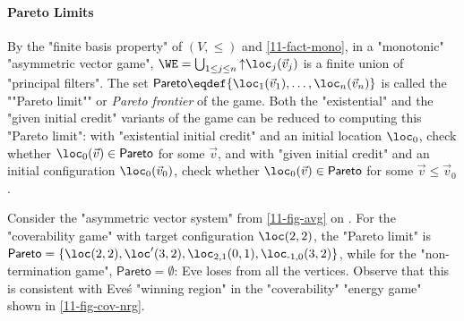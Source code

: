 \paragraph{Pareto Limits}\AP By the "finite basis property" of
$(V,{\leq})$ and \cref{11-fact-mono}, in a "monotonic" "asymmetric
vector game", $\WE=\bigcup_{1\leq j\leq n}{\uparrow}\loc_j(\vec v_j)$
is a finite union of "principal filters".  The set
$\mathsf{Pareto}\eqdef\{\loc_1(\vec v_1),\dots,\loc_n(\vec v_n)\}$ is
called the ""Pareto limit"" or \emph{Pareto frontier} of the game.
Both the "existential" and the "given initial credit" variants of the
game can be reduced to computing this "Pareto limit": with
"existential initial credit" and an initial location $\loc_0$, check
whether $\loc_0(\vec v)\in\mathsf{Pareto}$ for some $\vec v$, and with
"given initial credit" and an initial configuration $\loc_0(\vec v_0)$, check
whether $\loc_0(\vec v)\in\mathsf{Pareto}$ for some $\vec v\leq\vec
v_0$.
\begin{example}
  Consider the "asymmetric vector system" from \cref{11-fig-avg} on
  .  For the "coverability game" with target
  configuration $\loc(2,2)$, the "Pareto limit" is
  $\mathsf{Pareto}=\{\loc(2,2),\loc'(3,2),\loc_{2,1}(0,1),\loc_{\text-1,0}(3,2)\}$,
  while for the "non-termination game", $\mathsf{Pareto}=\emptyset$:
  Eve loses from all the vertices.  Observe that this is consistent
  with Eve\'s "winning region" in the "coverability" "energy game"
  shown in \cref{11-fig-cov-nrg}.
\end{example}


